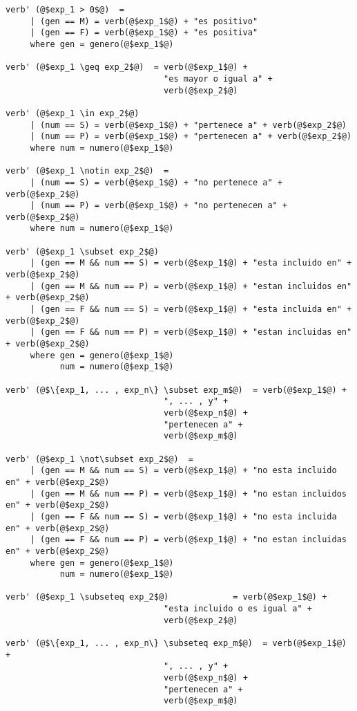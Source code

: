 \documentclass{article}
\begin{document}
\begin{verbatim}
verb' (@$exp_1 > 0$@)  =
     | (gen == M) = verb(@$exp_1$@) + "es positivo" 
     | (gen == F) = verb(@$exp_1$@) + "es positiva" 
     where gen = genero(@$exp_1$@)

verb' (@$exp_1 \geq exp_2$@)  = verb(@$exp_1$@) +  
                                "es mayor o igual a" +  
                                verb(@$exp_2$@) 

verb' (@$exp_1 \in exp_2$@)
     | (num == S) = verb(@$exp_1$@) + "pertenece a" + verb(@$exp_2$@) 
     | (num == P) = verb(@$exp_1$@) + "pertenecen a" + verb(@$exp_2$@) 
     where num = numero(@$exp_1$@)

verb' (@$exp_1 \notin exp_2$@)  = 
     | (num == S) = verb(@$exp_1$@) + "no pertenece a" + verb(@$exp_2$@) 
     | (num == P) = verb(@$exp_1$@) + "no pertenecen a" + verb(@$exp_2$@) 
     where num = numero(@$exp_1$@)

verb' (@$exp_1 \subset exp_2$@)
     | (gen == M && num == S) = verb(@$exp_1$@) + "esta incluido en" + verb(@$exp_2$@) 
     | (gen == M && num == P) = verb(@$exp_1$@) + "estan incluidos en" + verb(@$exp_2$@) 
     | (gen == F && num == S) = verb(@$exp_1$@) + "esta incluida en" + verb(@$exp_2$@) 
     | (gen == F && num == P) = verb(@$exp_1$@) + "estan incluidas en" + verb(@$exp_2$@) 
     where gen = genero(@$exp_1$@)
           num = numero(@$exp_1$@)

verb' (@$\{exp_1, ... , exp_n\} \subset exp_m$@)  = verb(@$exp_1$@) +  
                                ", ... , y" +  
                                verb(@$exp_n$@) +  
                                "pertenecen a" +
                                verb(@$exp_m$@)

verb' (@$exp_1 \not\subset exp_2$@)  = 
     | (gen == M && num == S) = verb(@$exp_1$@) + "no esta incluido en" + verb(@$exp_2$@) 
     | (gen == M && num == P) = verb(@$exp_1$@) + "no estan incluidos en" + verb(@$exp_2$@) 
     | (gen == F && num == S) = verb(@$exp_1$@) + "no esta incluida en" + verb(@$exp_2$@) 
     | (gen == F && num == P) = verb(@$exp_1$@) + "no estan incluidas en" + verb(@$exp_2$@) 
     where gen = genero(@$exp_1$@)
           num = numero(@$exp_1$@)

verb' (@$exp_1 \subseteq exp_2$@)             = verb(@$exp_1$@) +  
                                "esta incluido o es igual a" +  
                                verb(@$exp_2$@) 

verb' (@$\{exp_1, ... , exp_n\} \subseteq exp_m$@)  = verb(@$exp_1$@) +  
                                ", ... , y" +  
                                verb(@$exp_n$@) +  
                                "pertenecen a" +
                                verb(@$exp_m$@)


\end{verbatim}
\end{document}
